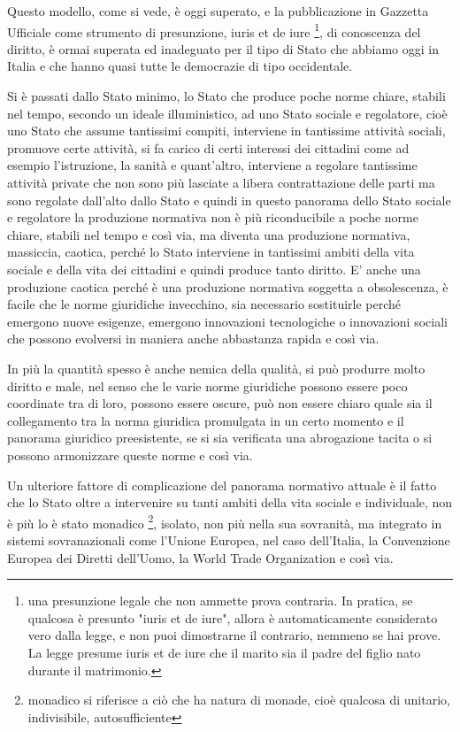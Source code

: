 Questo modello, come si vede, è oggi superato, e la pubblicazione in Gazzetta Ufficiale come strumento di presunzione, iuris et de iure \footnote{una presunzione legale che non ammette prova contraria. In pratica, se qualcosa è presunto "iuris et de iure", allora è automaticamente considerato vero dalla legge, e non puoi dimostrarne il contrario, nemmeno se hai prove. La legge presume iuris et de iure che il marito sia il padre del figlio nato durante il matrimonio.}, di conoscenza del diritto, è ormai superata ed inadeguato per il tipo di Stato che abbiamo oggi in Italia e che hanno quasi tutte le democrazie di tipo occidentale.

Si è passati dallo Stato minimo, lo Stato che produce poche norme chiare, stabili nel tempo, secondo un ideale illuministico, ad uno Stato sociale e regolatore, cioè uno Stato che assume tantissimi compiti, interviene in tantissime attività sociali, promuove certe attività, si fa carico di certi interessi dei cittadini come ad esempio l'istruzione, la sanità e quant'altro, interviene a regolare tantissime attività private che non sono più lasciate a libera contrattazione delle parti ma sono regolate dall'alto dallo Stato e quindi in questo panorama dello Stato sociale e regolatore la produzione normativa non è più riconducibile a poche norme chiare, stabili nel tempo e così via, ma diventa una produzione normativa, massiccia, caotica, perché lo Stato interviene in tantissimi ambiti della vita sociale e della vita dei cittadini e quindi produce tanto diritto. E' anche una produzione caotica perché è una produzione normativa soggetta a obsolescenza, è facile che le norme giuridiche invecchino, sia necessario sostituirle perché emergono nuove esigenze, emergono innovazioni tecnologiche o innovazioni sociali che possono evolversi in maniera anche abbastanza rapida e così via.

In più la quantità spesso è anche nemica della qualità, si può produrre molto diritto e male, nel senso che le varie norme giuridiche possono essere poco coordinate tra di loro, possono essere oscure, può non essere chiaro quale sia il collegamento tra la norma giuridica promulgata in un certo momento e il panorama giuridico preesistente, se si sia verificata una abrogazione tacita o si possono armonizzare queste norme e così via.

Un ulteriore fattore di complicazione del panorama normativo attuale è il fatto che lo Stato oltre a intervenire su tanti ambiti della vita sociale e individuale, non è più lo è stato monadico \footnote{monadico si riferisce a ciò che ha natura di monade, cioè qualcosa di unitario, indivisibile, autosufficiente}, isolato, non più nella sua sovranità, ma integrato in sistemi sovranazionali come l'Unione Europea, nel caso dell'Italia, la Convenzione Europea dei Diretti dell'Uomo, la World Trade Organization e così via. 

